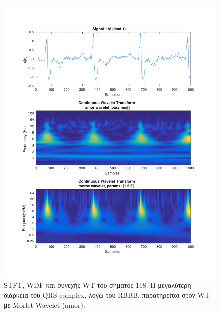 \documentclass[11pt,a4paper]{article}
\begin{document}
\begin{figure}[H]
\begin{minipage}{0.48\textwidth}
	\includegraphics[width=\textwidth]{fig/118l1_cwt.pdf}
\end{minipage}
\vfill
\caption{STFT, WDF και συνεχής WT του σήματος 118. Η μεγαλύτερη διάρκεια του QRS complex, λόγω του RBBB, παρατηρείται στον WT με Morlet Wavelet (amor).}
\label{fig:118l1_stft_wdf_wt}
\end{figure}
\end{document}

